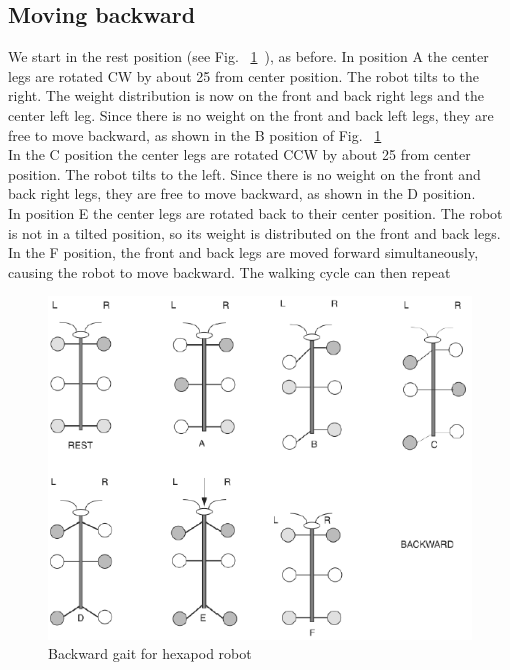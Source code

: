 \documentclass{report}
\begin{document}
\subsection{Moving backward}
We start in the rest position (see Fig. ~\ref{fig36}\ ), as before. In position A the center legs are rotated CW by
about 25 from center position. The robot tilts to the right. The weight distribution is now on the front and
back right legs and the center left leg. Since there is no weight on the front and back left legs, they are free
to move backward, as shown in the B position of Fig. ~\ref{fig36}\ \\
In the C position the center legs are rotated CCW by about 25 from center position. The robot tilts
to the left. Since there is no weight on the front and back right legs, they are free to move backward, as
shown in the D position.\\
In position E the center legs are rotated back to their center position. The robot is not in a tilted position,
so its weight is distributed on the front and back legs. In the F position, the front and back legs are moved
forward simultaneously, causing the robot to move backward. The walking cycle can then repeat\\
\begin{figure}[h!]
\centering
\includegraphics[width=\textwidth]{fig104}
\caption{Backward gait for hexapod robot}
\label{fig36}
\end{figure}
\FloatBarrier
\end{document}

